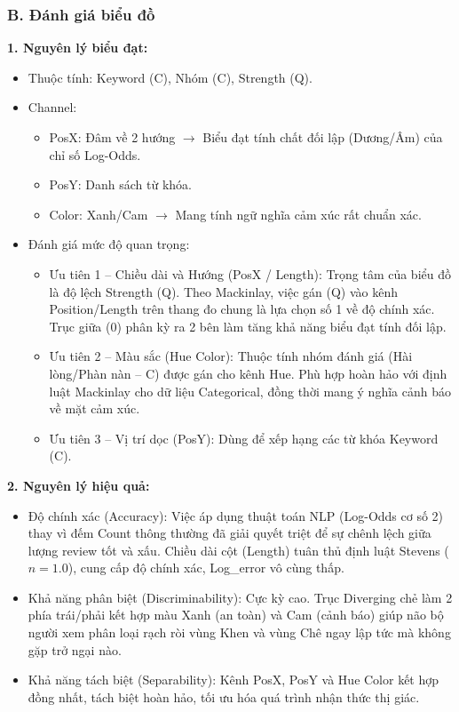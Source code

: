 \subsubsection*{B. Đánh giá biểu đồ}

\textbf{1. Nguyên lý biểu đạt:}

\begin{itemize}
    \item Thuộc tính: Keyword (C), Nhóm (C), Strength (Q).
    \item Channel:
    \begin{itemize}
        \item PosX: Đâm về 2 hướng $\rightarrow$ Biểu đạt tính chất đối lập (Dương/Âm) của chỉ số Log-Odds.
        \item PosY: Danh sách từ khóa.
        \item Color: Xanh/Cam $\rightarrow$ Mang tính ngữ nghĩa cảm xúc rất chuẩn xác.
    \end{itemize}
    \item Đánh giá mức độ quan trọng:
    \begin{itemize}
        \item Ưu tiên 1 -- Chiều dài và Hướng (PosX / Length): Trọng tâm của biểu đồ là độ lệch Strength (Q). Theo Mackinlay, việc gán (Q) vào kênh Position/Length trên thang đo chung là lựa chọn số 1 về độ chính xác. Trục giữa (0) phân kỳ ra 2 bên làm tăng khả năng biểu đạt tính đối lập.
        \item Ưu tiên 2 -- Màu sắc (Hue Color): Thuộc tính nhóm đánh giá (Hài lòng/Phàn nàn -- C) được gán cho kênh Hue. Phù hợp hoàn hảo với định luật Mackinlay cho dữ liệu Categorical, đồng thời mang ý nghĩa cảnh báo về mặt cảm xúc.
        \item Ưu tiên 3 -- Vị trí dọc (PosY): Dùng để xếp hạng các từ khóa Keyword (C).
    \end{itemize}
\end{itemize}

\textbf{2. Nguyên lý hiệu quả:}

\begin{itemize}
    \item Độ chính xác (Accuracy): Việc áp dụng thuật toán NLP (Log-Odds cơ số 2) thay vì đếm Count thông thường đã giải quyết triệt để sự chênh lệch giữa lượng review tốt và xấu. Chiều dài cột (Length) tuân thủ định luật Stevens ($n = 1.0$), cung cấp độ chính xác, Log\_error vô cùng thấp.
    \item Khả năng phân biệt (Discriminability): Cực kỳ cao. Trục Diverging chẻ làm 2 phía trái/phải kết hợp màu Xanh (an toàn) và Cam (cảnh báo) giúp não bộ người xem phân loại rạch ròi vùng Khen và vùng Chê ngay lập tức mà không gặp trở ngại nào.
    \item Khả năng tách biệt (Separability): Kênh PosX, PosY và Hue Color kết hợp đồng nhất, tách biệt hoàn hảo, tối ưu hóa quá trình nhận thức thị giác.
\end{itemize}

